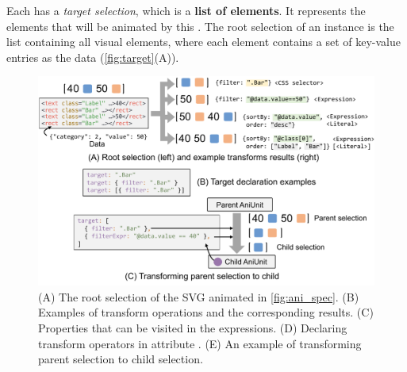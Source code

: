 Each \aniunit{} has a \textit{target selection}, which is a \textbf{list of elements}.
It represents the elements that will be animated by this \aniunit{}.
The root selection of an instance is the list containing all visual elements, where each element contains a set of key-value entries as the data (\autoref{fig:target}(A)).

\begin{figure}[h]
  \centering
  \includegraphics[width=\linewidth]{figs/transform.pdf}
  \caption{
  (A) The root selection of the SVG animated in \autoref{fig:ani_spec}. 
  (B) Examples of transform operations and the corresponding results.
  (C) Properties that can be visited in the expressions.
  (D) Declaring transform operators in attribute .
  (E) An example of transforming parent selection to child selection.
  }
  \label{fig:target}
\end{figure}


